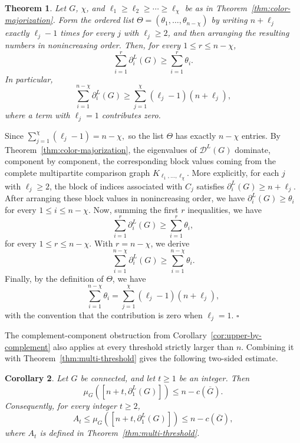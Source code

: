 \documentclass[12pt]{article}
\newcommand{\DL}{\mathcal{D}^{L}}
\newcommand{\comp}[1]{\overline{#1}}
\theoremstyle{plain}
\newtheorem{theorem}{Theorem}[section]
\newtheorem{corollary}[theorem]{Corollary}
\theoremstyle{definition}
\renewenvironment{proof}{{\noindent\bfseries Proof. }}{\hfill$\square$\par}
\begin{document}
\begin{theorem}\label{thm:ky-fan}
	Let $G$, $\chi$, and $\ell_1\ge\ell_2\ge\cdots\ge\ell_\chi$ 
	be as in Theorem~\ref{thm:color-majorization}. Form the ordered list
	 $\Theta=(\theta_1,\dots,\theta_{n-\chi})$ by writing $n+\ell_j$ exactly $\ell_j-1$ times for every $j$ with $\ell_j\ge2$, and then arranging the resulting numbers in nonincreasing order. Then, for every
	$1\le r\le n-\chi$, 
	\[
	\sum_{i=1}^{r}\partial_i^{L}(G)\ge \sum_{i=1}^{r}\theta_i.
	\]
	In particular,
	\[
	\sum_{i=1}^{n-\chi}\partial_i^{L}(G)
	\ge
	\sum_{j=1}^{\chi}(\ell_j-1)(n+\ell_j),
	\]
	where a term with $\ell_j=1$ contributes zero.
\end{theorem}

\begin{proof}
	Since $\sum_{j=1}^{\chi}(\ell_j-1)=n-\chi,$ so the list $\Theta$ has exactly $n-\chi$ entries. By Theorem~\ref{thm:color-majorization}, the eigenvalues of $\DL(G)$ dominate, component by component, the corresponding block values coming from the complete multipartite comparison graph
	$K_{\ell_1,\dots,\ell_\chi}$. More explicitly, for each $j$ with $\ell_j\ge2$, the block of indices associated with $C_j$ satisfies
	$\partial_i^{L}(G)\ge n+\ell_j.$ After arranging these block values in nonincreasing order, we have 
	 $\partial_i^{L}(G)\ge\theta_i$ for every $1\le i\le n-\chi.$ Now, summing the first $r$ inequalities, we have
	\[
	\sum_{i=1}^{r}\partial_i^{L}(G)
	\ge
	\sum_{i=1}^{r}\theta_i,
	\]
	for every $1\le r\le n-\chi$. With $r=n-\chi$, we derive
	\[
	\sum_{i=1}^{n-\chi}\partial_i^{L}(G)
	\ge
	\sum_{i=1}^{n-\chi}\theta_i.
	\]
	Finally, by the definition of $\Theta$, we have
	\[
	\sum_{i=1}^{n-\chi}\theta_i
	=
	\sum_{j=1}^{\chi}(\ell_j-1)(n+\ell_j),
	\]
	with the convention that the contribution is zero when $\ell_j=1$.
\end{proof}

\medskip
\noindent The complement-component obstruction from Corollary~\ref{cor:upper-by-complement} also applies at every threshold strictly larger than $n$. Combining it with Theorem~\ref{thm:multi-threshold} gives the following two-sided estimate.

\begin{corollary}\label{cor:sandwich}
	Let $G$ be connected, and let $t\ge1$ be an integer. Then
	\[
	\mu_G([n+t,\partial^{L}_1(G)])\le n-c(\comp{G}).
	\]
	Consequently, for every integer $t\ge2$,
	\[
	A_t
	\le
	\mu_G([n+t,\partial^{L}_1(G)])
	\le
	n-c(\comp{G}),
	\]
	where $A_t$ is defined in Theorem~\ref{thm:multi-threshold}.
\end{corollary}
\end{document}
